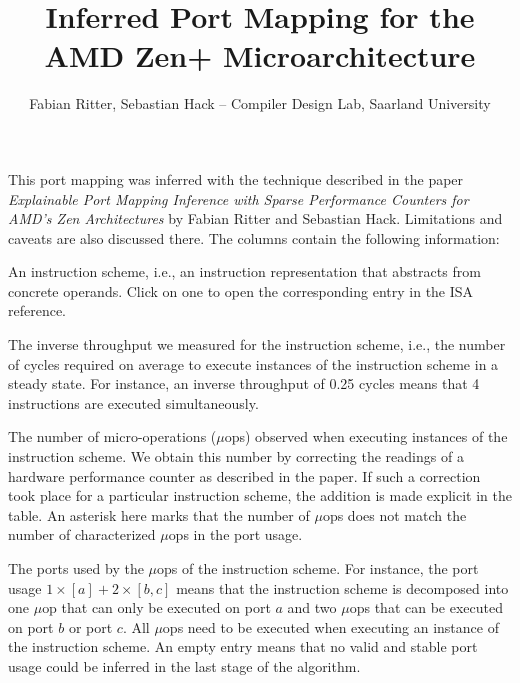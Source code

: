 \title{Inferred Port Mapping for the AMD Zen+ Microarchitecture}
\author{Fabian Ritter, Sebastian Hack -- Compiler Design Lab, Saarland University}
\maketitle

\noindent
This port mapping was inferred with the technique described in the paper \emph{Explainable Port Mapping Inference with Sparse Performance Counters for AMD’s Zen Architectures} by Fabian Ritter and Sebastian Hack.
Limitations and caveats are also discussed there.
The columns contain the following information:
    \begin{description}[labelindent=0.5cm, leftmargin=1.0cm]
        \item[Instruction Scheme:] An instruction scheme, i.e., an instruction representation that abstracts from concrete operands. Click on one to open the corresponding entry in the ISA reference.
        \item[\(\mathit{tp}^{-1}\):] The inverse throughput we measured for the instruction scheme, i.e., the number of cycles required on average to execute instances of the instruction scheme in a steady state.
            For instance, an inverse throughput of 0.25 cycles means that 4 instructions are executed simultaneously.
        \item[\#\(\mu\)ops:] The number of micro-operations (\(\mu\)ops) observed when executing instances of the instruction scheme.
            We obtain this number by correcting the readings of a hardware performance counter as described in the paper.
            If such a correction took place for a particular instruction scheme, the addition is made explicit in the table.
            An asterisk here marks that the number of \(\mu\)ops does not match the number of characterized \(\mu\)ops in the port usage.
        \item[Port Usage:] The ports used by the \(\mu\)ops of the instruction scheme.
            For instance, the port usage \(1\times [a] + 2\times [b, c]\) means that the instruction scheme is decomposed into one \(\mu\)op that can only be executed on port \(a\) and two \(\mu\)ops that can be executed on port $b$ or port $c$.
            All \(\mu\)ops need to be executed when executing an instance of the instruction scheme.
            An empty entry means that no valid and stable port usage could be inferred in the last stage of the algorithm.
    \end{description}

